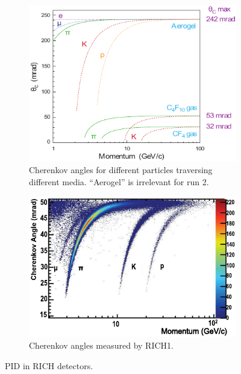 \begin{figure}[!htb]
    \centering
    \begin{subfigure}[t]{0.45\textwidth}
        \centering
        \includegraphics[width=\textwidth]{./figs-detector/pid/cherenkov_angle_media.pdf}
        \caption{
            Cherenkov angles for different particles traversing different media.
            ``Aerogel'' is irrelevant for run 2.
        }
    \end{subfigure}
    \hspace{12pt}
    \begin{subfigure}[t]{0.45\textwidth}
        \centering
        \includegraphics[width=\textwidth]{./figs-detector/pid/rich1_measurement.pdf}
        \caption{Cherenkov angles measured by RICH1.}
    \end{subfigure}

    \caption{
        PID in RICH detectors.
    }
    \label{fig:rich-plots}
\end{figure}

